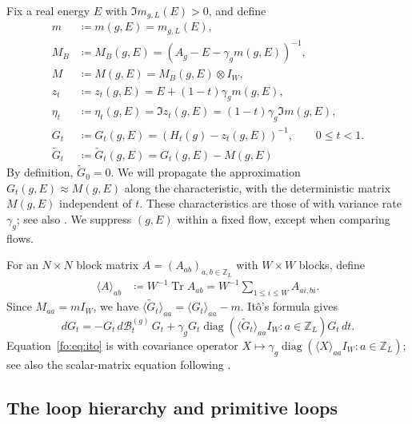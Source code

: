 \documentclass[11pt]{article}
\numberwithin{equation}{section}
\theoremstyle{remark}
\newcommand{\Z}{\mathbb Z}
\newcommand{\Tr}{\operatorname{Tr}}
\newcommand{\wt}{\widetilde}
\newcommand{\diag}{\operatorname{diag}}
\begin{document}
Fix a real energy $E$ with $\Im m_{g,L}(E)>0$, and define
\begin{equation}\label{fo:eq:characteristic}
 \begin{aligned}
 m&\coloneqq m(g,E)=m_{g,L}(E),\\
 M_B&\coloneqq M_B(g,E)=(A_g-E-\gamma_g m(g,E))^{-1},\\
 M&\coloneqq M(g,E)=M_B(g,E)\otimes I_W,\\
 z_t&\coloneqq z_t(g,E)=E+(1-t)\gamma_g m(g,E),\\
 \eta_t&\coloneqq\eta_t(g,E)=\Im z_t(g,E)
       =(1-t)\gamma_g\Im m(g,E),\\
 G_t&\coloneqq G_t(g,E)=(H_t(g)-z_t(g,E))^{-1},\qquad 0\le t<1.\\
 \wt G_t &\coloneqq\wt G_t(g,E)=G_t(g,E)-M(g,E)
 \end{aligned}
\end{equation}
By definition, $\wt G_0=0$. We will propagate the approximation $G_t(g,E)\approx M(g,E)$ along the
characteristic, with the deterministic matrix $M(g,E)$ independent of $t$. These characteristics are those of \cite[Definitions~3.1--3.2, (3.5)--(3.8)]{TYY}
with variance rate $\gamma_g$; see also \cite[Definition~2.7]{YY}.
We suppress $(g, E)$ within a fixed flow, except when comparing flows.


For an $N\times N$ block matrix $A=(A_{ab})_{a,b\in\Z_L}$ with
$W\times W$ blocks, define
\[
 \begin{aligned}
 \langle A\rangle_{ab}&\coloneqq W^{-1}\Tr A_{ab}
       =W^{-1}\sum_{1\le i\le W} A_{ai,bi}.
 \end{aligned}
\] 
Since $M_{aa}=mI_W$, we have
$\langle\wt G_t\rangle_{aa}=\langle G_t\rangle_{aa}-m$.
It\^o's formula gives
\begin{equation}\label{fo:eq:ito}
 dG_t=-G_t\,d\mathcal B_t^{(g)}\,G_t
       +\gamma_g G_t\diag(\langle\wt G_t\rangle_{aa}I_W:a\in\Z_L)G_t\,dt.
\end{equation}
Equation~\eqref{fo:eq:ito} is \cite[(3.9)--(3.10)]{TYY} with covariance
operator $X\mapsto\gamma_g\diag(\langle X\rangle_{aa}I_W:a\in\Z_L)$;
see also the scalar-matrix equation following \cite[Definition~2.7]{YY}.

\subsection{The loop hierarchy and primitive loops}
\label{sec:fo-loops}\label{sec:fo-primitives}
\end{document}
